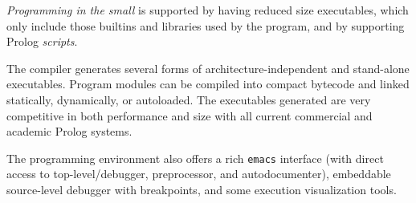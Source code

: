 \documentclass{article}
\begin{document}
\emph{Programming in the small} is supported by having reduced size
executables, which only include those builtins and libraries used by
the program, and by supporting
Prolog \emph{scripts}.

The compiler generates several forms of architecture-independent and
stand-alone executables. Program modules can be compiled into compact
bytecode and linked statically, dynamically, or autoloaded. The
executables generated are very competitive in both performance and
size with all current commercial and academic Prolog systems.

The programming environment also offers a rich \texttt{emacs}
interface (with direct access to top-level/debugger, preprocessor,
and autodocumenter), embeddable source-level debugger with
breakpoints, and some execution visualization tools. 
\end{document}
